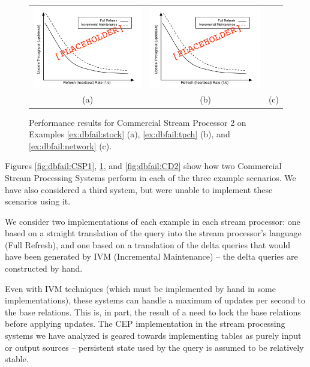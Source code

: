 \begin{figure}
\begin{center}
\begin{tabular}{ccc}
\includegraphics[width=2in]{../graphics-tmp/placeholder_stream_result} &
\includegraphics[width=2in]{../graphics-tmp/placeholder_stream_result} \\
(a) & (b) & (c)
\end{tabular}
\end{center}
\label{fig:dbfail:CSP2}
\caption{Performance results for Commercial Stream Processor 2 on Examples \ref{ex:dbfail:stock} (a), \ref{ex:dbfail:tpch} (b), and \ref{ex:dbfail:network} (c).}
\end{figure}

Figures \ref{fig:dbfail:CSP1}, \ref{fig:dbfail:CSP2}, and \ref{fig:dbfail:CD2} show how two Commercial Stream Processing Systems perform in each of the three example scenarios.  We have also considered a third system, but were unable to implement these scenarios using it.

We consider two implementations of each example in each stream processor: one based on a straight translation of the query into the stream processor's language (Full Refresh), and one based on a translation of the delta queries that would have been generated by IVM (Incremental Maintenance) -- the delta queries are constructed by hand.

Even with IVM techniques (which must be implemented by hand in some implementations), these systems can handle a maximum of  updates per second to the base relations.  This is, in part, the result of a need to lock the base relations before applying updates.  The CEP implementation in the stream processing systems we have analyzed is geared towards implementing tables as purely input or output sources -- persistent state used by the query is assumed to be relatively stable.  

